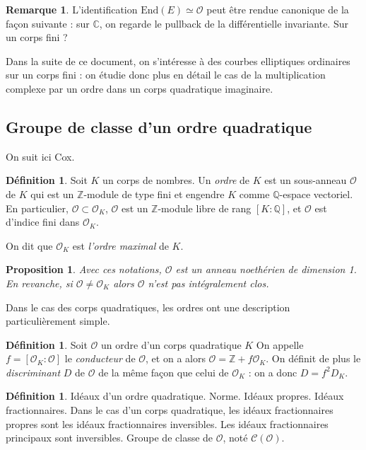 \documentclass[11pt,a4paper]{article}
\newcommand{\Z}{\mathbb{Z}}
\newcommand{\C}{\mathbb{C}}
\newcommand{\Q}{\mathbb{Q}}
\renewcommand{\O}{\mathcal{O}}
\newcommand{\Cl}{\mathcal{C}}
\newcommand{\End}{\mathrm{End}}
\newtheorem{prop}[thm]{Proposition}
\theoremstyle{definition}
\newtheorem*{rem}{Remarque}
\newtheorem{defi}[thm]{Définition}
\begin{document}
\begin{rem}
L'identification $\End(E)\simeq \O$ peut être rendue canonique de la façon suivante : sur $\C$, on regarde le pullback de la différentielle invariante. Sur un corps fini ?
\end{rem}

Dans la suite de ce document, on s'intéresse à des courbes elliptiques ordinaires sur un corps fini : on étudie donc plus en détail le cas de la multiplication complexe par un ordre dans un corps quadratique imaginaire.

\subsection{Groupe de classe d'un ordre quadratique}

On suit ici Cox.

\begin{defi}
Soit $K$ un corps de nombres. Un \emph{ordre} de $K$ est un sous-anneau $\O$ de $K$ qui est un $\Z$-module de type fini et engendre $K$ comme $\Q$-espace vectoriel. En particulier, $\O\subset \O_K$, $\O$ est un $\Z$-module libre de rang $[K:\Q]$, et $\O$ est d'indice fini dans $\O_K$.

On dit que $\O_K$ est \emph{l'ordre maximal} de $K$.
\end{defi}

\begin{prop}
Avec ces notations, $\O$ est un anneau noethérien de dimension 1. En revanche, si $\O\neq \O_K$ alors $\O$ n'est pas intégralement clos.
\end{prop}

Dans le cas des corps quadratiques, les ordres ont une description particulièrement simple.

\begin{defi}
Soit $\O$ un ordre d'un corps quadratique $K$ On appelle $f=[\O_K:\O]$ le \emph{conducteur} de $\O$, et on a alors $\O=\Z+f \O_K$. On définit de plus le \emph{discriminant} $D$ de $\O$ de la même façon que celui de $\O_K$ : on a donc $D=f^2 D_K$.
\end{defi}

\begin{defi}
Idéaux d'un ordre quadratique. Norme. Idéaux propres. Idéaux fractionnaires. Dans le cas d'un corps quadratique, les idéaux fractionnaires propres sont les idéaux fractionnaires inversibles. Les idéaux fractionnaires principaux sont inversibles. Groupe de classe de $\O$, noté $\Cl(\O)$.
\end{defi}
\end{document}
